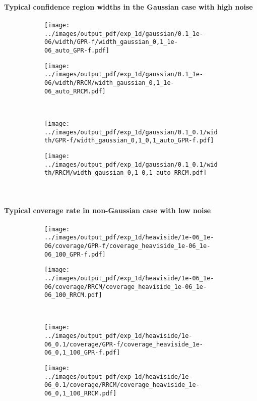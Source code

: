 \documentclass[t]{beamer}  %
\begin{document}
\begin{frame}[t]\frametitle{\insertsection}
  \framesubtitle{Typical confidence region widths in the Gaussian case with high noise}
  \begin{figure}
    \centering
    \begin{subfigure}[b]{0.45\linewidth}
      \texttt{[image: ../images/output\_pdf/exp\_1d/gaussian/0.1\_1e-06/width/GPR-f/width\_gaussian\_0,1\_1e-06\_auto\_GPR-f.pdf]}
    \end{subfigure}%
    \begin{subfigure}[b]{0.45\linewidth}
      \texttt{[image: ../images/output\_pdf/exp\_1d/gaussian/0.1\_1e-06/width/RRCM/width\_gaussian\_0,1\_1e-06\_auto\_RRCM.pdf]}
    \end{subfigure}\\
    \begin{subfigure}[b]{0.45\linewidth}
      \texttt{[image: ../images/output\_pdf/exp\_1d/gaussian/0.1\_0.1/width/GPR-f/width\_gaussian\_0,1\_0,1\_auto\_GPR-f.pdf]}
    \end{subfigure}%
    \begin{subfigure}[b]{0.45\linewidth}
      \texttt{[image: ../images/output\_pdf/exp\_1d/gaussian/0.1\_0.1/width/RRCM/width\_gaussian\_0,1\_0,1\_auto\_RRCM.pdf]}
    \end{subfigure}\\
  \end{figure}
\end{frame}

\begin{frame}[t]\frametitle{\insertsection}
  \framesubtitle{Typical coverage rate in non-Gaussian case with low noise}
  \begin{figure}%
    \centering
    \begin{subfigure}[b]{0.45\linewidth}
      \texttt{[image: ../images/output\_pdf/exp\_1d/heaviside/1e-06\_1e-06/coverage/GPR-f/coverage\_heaviside\_1e-06\_1e-06\_100\_GPR-f.pdf]}
    \end{subfigure}%
    \begin{subfigure}[b]{0.45\linewidth}
      \texttt{[image: ../images/output\_pdf/exp\_1d/heaviside/1e-06\_1e-06/coverage/RRCM/coverage\_heaviside\_1e-06\_1e-06\_100\_RRCM.pdf]}
    \end{subfigure}\\
    \begin{subfigure}[b]{0.45\linewidth}
      \texttt{[image: ../images/output\_pdf/exp\_1d/heaviside/1e-06\_0.1/coverage/GPR-f/coverage\_heaviside\_1e-06\_0,1\_100\_GPR-f.pdf]}
    \end{subfigure}%
    \begin{subfigure}[b]{0.45\linewidth}
      \texttt{[image: ../images/output\_pdf/exp\_1d/heaviside/1e-06\_0.1/coverage/RRCM/coverage\_heaviside\_1e-06\_0,1\_100\_RRCM.pdf]}
    \end{subfigure}\\
  \end{figure}
\end{frame}
\end{document}

